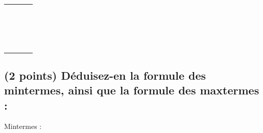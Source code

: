 \documentclass[11pt,a4paper]{article}
\begin{document}
\begin{table}[!ht]
\begin{minipage}{0.50\textwidth}
\begin{center}
\begin{tabular}{|C{0.75cm}|C{0.75cm}|C{0.75cm} | C{0.75cm}|}
\hline
{} &  &   &   \\
 &  &   &   \\
\hline
 & &   &  \\
 & &   &  \\ \hline
 & &   &  \\
 & &   &  \\ \hline
 & &   &  \\
 & &   &  \\ \hline
 & &   &  \\
 & &   &  \\ \hline
 & &   &  \\
 & &   &  \\ \hline
 & &   &  \\
 & &   &  \\ \hline
 & &   &  \\
 & &   &  \\ \hline
 & &   &  \\
 & &   &  \\ \hline
\end{tabular}
\end{center}

\smallskip

  \end{minipage}
  \hfillx
  \begin{minipage}{0.50\textwidth}

\subsection{(2 points) Déduisez-en la formule des mintermes, ainsi que la formule des maxtermes : }

\bigskip

Mintermes :

\vspace*{3.55cm}


\end{minipage}
\end{table}
\end{document}
